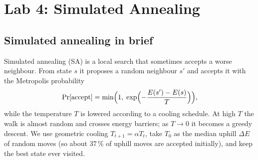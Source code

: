 \documentclass[journal]{IEEEtran}
\begin{document}
\section{Lab 4: Simulated Annealing}
\subsection{Simulated annealing in brief}
Simulated annealing (SA) \cite{kirkpatrick1983,delahaye2019} is a local search that sometimes
accepts a worse neighbour. From state $s$ it proposes a random neighbour $s'$ and accepts it
with the Metropolis probability
\begin{equation}
\Pr[\text{accept}] = \min\Bigl(1,\; \exp\Bigl(-\frac{E(s')-E(s)}{T}\Bigr)\Bigr),
\end{equation}
while the temperature $T$ is lowered according to a cooling schedule. At high $T$ the walk is
almost random and crosses energy barriers; as $T\to0$ it becomes a greedy descent. We use
geometric cooling $T_{t+1}=\alpha T_t$, take $T_0$ as the median uphill $\Delta E$ of random
moves (so about 37\,\% of uphill moves are accepted initially), and keep the best state ever
visited.
\end{document}
